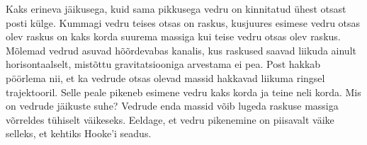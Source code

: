 \documentclass[10pt]{article}
\begin{document}
Kaks erineva jäikusega, kuid sama pikkusega vedru on kinnitatud ühest otsast posti külge. Kummagi vedru teises otsas on raskus, kusjuures esimese vedru otsas olev raskus on kaks korda suurema massiga kui teise vedru otsas olev raskus. Mõlemad vedrud asuvad hõõrdevabas kanalis, kus raskused saavad liikuda ainult horisontaalselt, mistõttu gravitatsiooniga arvestama ei pea. Post hakkab pöörlema nii, et ka vedrude otsas olevad massid hakkavad liikuma ringsel trajektooril. Selle peale pikeneb esimene vedru kaks korda ja teine neli korda. Mis on vedrude jäikuste suhe? Vedrude enda massid võib lugeda raskuse massiga võrreldes tühiselt väikeseks. Eeldage, et vedru pikenemine on piisavalt väike selleks, et kehtiks Hooke'i seadus.
\probend
\bigskip

\end{document}
